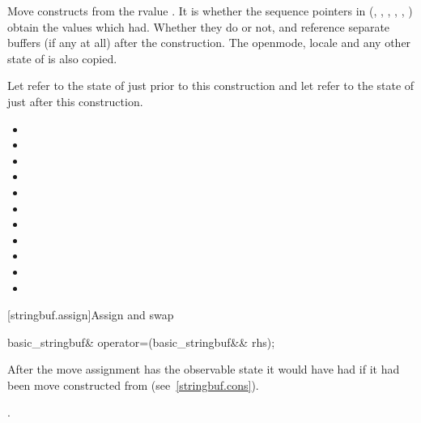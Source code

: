 \begin{itemdescr}
\pnum
\effects Move constructs from the rvalue . It
is
 whether the sequence pointers in 
(, , ,
, , ) obtain
the values which  had. Whether they do or not, 
and  reference separate buffers (if any at all) after the
construction. The openmode, locale and any other state of  is
also copied.

\pnum
\postconditions Let  refer to the state of
 just prior to this construction and let 
refer to the state of  just after this construction.

\begin{itemize}
\item {}
\item {}
\item {}
\item {}
\item {}
\item {}
\item {}
\item {}
\item {}
\item {}
\item {}
\end{itemize}
\end{itemdescr}

[stringbuf.assign]{Assign and swap}

%
\begin{itemdecl}
basic_stringbuf& operator=(basic_stringbuf&& rhs);
\end{itemdecl}

\begin{itemdescr}
\pnum
\effects After the move assignment  has the observable state it would
have had if it had been move constructed from  (see~\ref{stringbuf.cons}).

\pnum
\returns {}.
\end{itemdescr}

